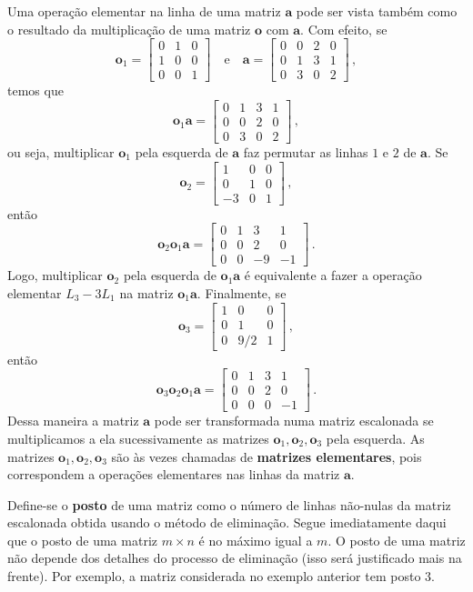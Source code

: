 \documentclass[12pt,a4paper]{report}
\newcommand{\tb}{\textbf}
\newcommand{\mb}{\mathbf}
\begin{document}
Uma operação elementar na linha de uma matriz $\mb a$ pode ser vista também como o resultado da multiplicação de uma matriz $\mb o$ com $\mb a$. Com efeito, se
$$\mb{o}_1=\begin{bmatrix}
  0&1&0\\
  1&0&0\\
  0&0&1
\end{bmatrix}\quad\text{e}\quad \mb a=\begin{bmatrix}
  0&0&2&0\\
  0&1&3&1\\
  0&3&0&2
\end{bmatrix}\,,$$
temos que
$$\mb{o}_1\mb a=\begin{bmatrix}
  0&1&3&1\\
  0&0&2&0\\
  0&3&0&2
\end{bmatrix}\,,$$
ou seja, multiplicar $\mb o_1$ pela esquerda de $\mb a$ faz permutar as linhas $1$ e $2$ de $\mb a$. Se
$$\mb o_2=\begin{bmatrix}
  1&0&0\\
  0&1&0\\
  -3&0&1
\end{bmatrix}\,,$$
então
$$\mb o_2\mb o_1\mb a=\begin{bmatrix}
  0&1&3&1\\
  0&0&2&0\\
  0&0&-9&-1
\end{bmatrix}\,.$$
Logo, multiplicar $\mb o_2$ pela esquerda de $\mb o_1\mb a$ é equivalente a fazer a operação elementar $L_3-3L_1$ na matriz $\mb o_1\mb a$. Finalmente, se
$$\mb o_3=\begin{bmatrix}
  1&0&0\\
  0&1&0\\
  0&9/2&1
\end{bmatrix}\,,$$
então
$$\mb o_3\mb o_2\mb o_1\mb a=\begin{bmatrix}
  0&1&3&1\\
  0&0&2&0\\
  0&0&0&-1
\end{bmatrix}\,.$$
Dessa maneira a matriz $\mb a$ pode ser transformada numa matriz escalonada se multiplicamos a ela sucessivamente as matrizes $\mb o_1,\mb o_2,\mb o_3$ pela esquerda. As matrizes $\mb o_1,\mb o_2,\mb o_3$ são às vezes chamadas de \tb{matrizes elementares}, pois correspondem a operações elementares nas linhas da matriz $\mb a$.

Define-se o \tb{posto} de uma matriz como o número de linhas não-nulas da matriz escalonada obtida usando o método de eliminação. Segue imediatamente daqui que o posto de uma matriz $m\times n$ é no máximo igual a $m$. O posto de uma matriz não depende dos detalhes do processo de eliminação (isso será justificado mais na frente). Por exemplo, a matriz considerada no exemplo anterior tem posto $3$.
\end{document}
